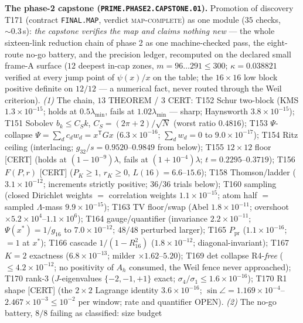 \par\smallskip\noindent\textbf{The phase-2 capstone
(\texttt{PRIME.PHASE2.CAPSTONE.01}).}
Promotion of discovery T171 (contract \texttt{FINAL.MAP}, verdict
\textsc{map-complete}) as one module ($35$ checks, ${\sim}0.3$\,s):
\emph{the capstone verifies the map and claims nothing new} --- the
whole sixteen-link reduction chain of phase 2 as one machine-checked
pass, the eight-route no-go battery, and the precision ledger,
recomputed on the declared small frame-A surface ($12$ deepest in-cap
zones, $m=96\ldots291\le300$; $\kappa=0.038821$ verified at every jump
point of $\psi(x)/x$ on the table; the $16\times16$ low block positive
definite on $12/12$ --- a numerical fact, never routed through the Weil
criterion).
\emph{(1)} The chain, $13$ THEOREM / $3$ CERT: T152 Schur two-block
(KMS $1.3\times10^{-15}$; holds at $0.5\lambda_{\min}$, fails at
$1.02\lambda_{\min}$ --- sharp; Haynsworth $3.8\times10^{-15}$); T151
Sobolev $b_k\le C_Sk$, $C_S=(2\pi+2)/\sqrt N$ (worst ratio $0.4816$);
T153 $\Psi$-collapse $\Psi=\sum_dc_dw_d=x^{\mathsf T}Gx$
($6.3\times10^{-16}$; $\sum_dw_d=0$ to $9.0\times10^{-17}$); T154 Ritz
ceiling (interlacing; $g_{32}/s=0.9520$--$0.9849$ from below); T155
$12\times12$ floor [CERT] (holds at $(1-10^{-9})\lambda$, fails at
$(1+10^{-4})\lambda$; $t=0.2295$--$0.3719$); T156 $F(P,r)$ [CERT]
($P_K\ge1$, $r_K\ge0$, $L(16)=6.6$--$15.6$); T158 Thomson/ladder
($3.1\times10^{-12}$; increments strictly positive; $36/36$ trials
below); T160 sampling (closed Dirichlet weights $=$ correlation
weights $1.1\times10^{-15}$; atom half $=$ sampled $\Lambda$-mass
$9.9\times10^{-15}$); T163 TV floor/swap (Abel $1.8\times10^{-11}$;
overshoot $\times5.2\times10^{4}$--$1.1\times10^{6}$); T164
gauge/quantifier (invariance $2.2\times10^{-11}$; $\Psi(x^*)=1/g_{16}$
to $7.0\times10^{-12}$; $48/48$ perturbed larger); T165
$P_{\mathrm{pr}}$ ($1.1\times10^{-16}$; $=1$ at $x^*$); T166 cascade
$1/(1-R_{16}^2)$ ($1.8\times10^{-12}$; diagonal-invariant); T167
$K=2$ exactness ($6.8\times10^{-13}$; milder $\times1.62$--$5.20$);
T169 det collapse R4-\emph{free} ($\le4.2\times10^{-12}$; no
positivity of $A_h$ consumed, the Weil fence never approached); T170
rank-3 ($J$-eigenvalues $\{-2,-1,+1\}$ exact;
$\sigma_4/\sigma_1\le1.6\times10^{-16}$); T170 R1 shape [CERT] (the
$2\times2$ Lagrange identity $3.6\times10^{-16}$; $\sin\angle=
1.169\times10^{-4}$--$2.467\times10^{-3}\le10^{-2}$ per window; rate
and quantifier OPEN).
\emph{(2)} The no-go battery, $8/8$ failing as classified: size budget
